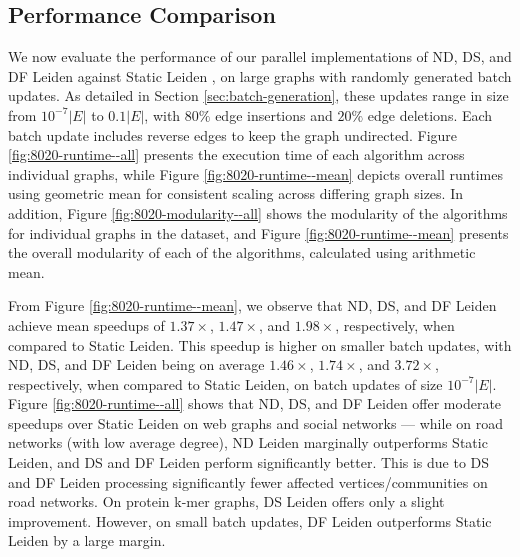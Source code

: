 

% 




\subsection{Performance Comparison}
\label{sec:performance-comparison}

We now evaluate the performance of our parallel implementations of ND, DS, and DF Leiden against Static Leiden \cite{sahu2024fast}, on large graphs with randomly generated batch updates. As detailed in Section \ref{sec:batch-generation}, these updates range in size from $10^{-7}|E|$ to $0.1|E|$, with $80\%$ edge insertions and $20\%$ edge deletions. Each batch update includes reverse edges to keep the graph undirected. Figure \ref{fig:8020-runtime--all} presents the execution time of each algorithm across individual graphs, while Figure \ref{fig:8020-runtime--mean} depicts overall runtimes using geometric mean for consistent scaling across differing graph sizes. In addition, Figure \ref{fig:8020-modularity--all} shows the modularity of the algorithms for individual graphs in the dataset, and Figure \ref{fig:8020-runtime--mean} presents the overall modularity of each of the algorithms, calculated using arithmetic mean.

From Figure \ref{fig:8020-runtime--mean}, we observe that ND, DS, and DF Leiden achieve mean speedups of $1.37\times$, $1.47\times$, and $1.98\times$, respectively, when compared to Static Leiden. This speedup is higher on smaller batch updates, with ND, DS, and DF Leiden being on average $1.46\times$, $1.74\times$, and $3.72\times$, respectively, when compared to Static Leiden, on batch updates of size $10^{-7}|E|$. Figure \ref{fig:8020-runtime--all} shows that ND, DS, and DF Leiden offer moderate speedups over Static Leiden on web graphs and social networks --- while on road networks (with low average degree), ND Leiden marginally outperforms Static Leiden, and DS and DF Leiden perform significantly better. This is due to DS and DF Leiden processing significantly fewer affected vertices/communities on road networks. On protein k-mer graphs, DS Leiden offers only a slight improvement. However, on small batch updates, DF Leiden outperforms Static Leiden by a large margin.


